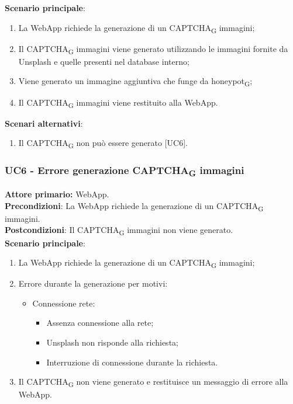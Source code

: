 \textbf{Scenario principale}:
\begin{enumerate}
    \item La WebApp richiede la generazione di un CAPTCHA\textsubscript{G} immagini;
    \item Il CAPTCHA\textsubscript{G} immagini viene generato utilizzando le immagini fornite da Unsplash e quelle presenti nel database interno;
    \item Viene generato un immagine aggiuntiva che funge da honeypot\textsubscript{G};
    \item Il CAPTCHA\textsubscript{G} immagini viene restituito alla WebApp.
\end{enumerate}
\textbf{Scenari alternativi}:
\begin{enumerate}
    \item Il CAPTCHA\textsubscript{G} non può essere generato [UC6].
\end{enumerate}

\subsubsection{UC6 - Errore generazione CAPTCHA\textsubscript{G} immagini}
\textbf{Attore primario:} WebApp.\\
\textbf{Precondizioni}: La WebApp richiede la generazione di un CAPTCHA\textsubscript{G} immagini.\\
\textbf{Postcondizioni}: Il CAPTCHA\textsubscript{G} immagini non viene generato.\\

\textbf{Scenario principale}:
\begin{enumerate}
    \item La WebApp richiede la generazione di un CAPTCHA\textsubscript{G} immagini;
    \item Errore durante la generazione per motivi:
		\begin{itemize}
    		\item Connessione rete:
			\begin{itemize}
	    		\item Assenza connessione alla rete;
	    		\item Unsplash non risponde alla richiesta;
			\item Interruzione di connessione durante la richiesta.
			\end{itemize}
		\end{itemize}
    \item Il CAPTCHA\textsubscript{G} non viene generato e restituisce un messaggio di errore alla WebApp.\\
\end{enumerate}

